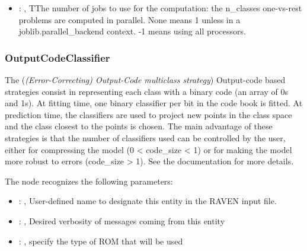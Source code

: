 \begin{itemize}
    \item {}: , 
      TThe number of jobs to use for the computation: the n\_classes one-vs-rest
      problems are computed in parallel. None means 1 unless in a joblib.parallel\_backend
      context. -1 means using all processors.
  \end{itemize}


\subsubsection{OutputCodeClassifier}
  The  (\textit{(Error-Correcting) Output-Code multiclass strategy})
  Output-code based strategies consist in representing each class with a binary code (an array of
  0s and 1s). At fitting time, one binary classifier per bit in the code book is fitted. At
  prediction time, the classifiers are used to project new points in the class space and the class
  closest to the points is chosen. The main advantage of these strategies is that the number of
  classifiers used can be controlled by the user, either for compressing the model
  (0 < code\_size < 1) or for making the model more robust to errors (code\_size > 1). See the
  documentation for more details.

  The  node recognizes the following parameters:
    \begin{itemize}
      \item {}: , 
        User-defined name to designate this entity in the RAVEN input file.
      \item {}: , 
        Desired verbosity of messages coming from this entity
      \item {}: , 
        specify the type of ROM that will be used
  \end{itemize}

